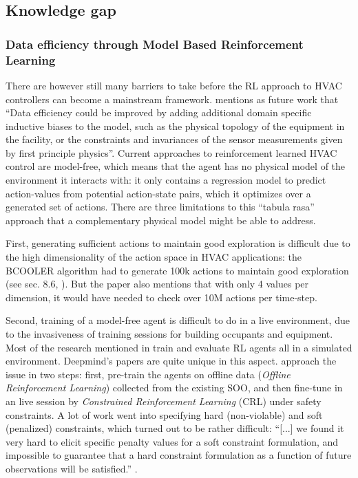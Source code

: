 \documentclass{article}
\theoremstyle{definition}
\theoremstyle{remark}
\begin{document}
\subsection{Knowledge gap}
\subsubsection{Data efficiency through Model Based Reinforcement Learning}
There are however still many barriers to take before the RL approach to HVAC controllers can become a mainstream framework. \cite{luo2022controlling} mentions as future work that ``Data efficiency could be improved by adding additional domain specific inductive biases to the model, such as the physical topology of the equipment in the facility, or the constraints and invariances of the sensor measurements given by first principle physics''. Current approaches to reinforcement learned HVAC control are model-free, which means that the agent has no physical model of the environment it interacts with: it only contains a regression model to predict action-values from potential action-state pairs, which it optimizes over a generated set of actions. There are three limitations to this ``tabula rasa'' approach that a complementary physical model might be able to address.

First, generating sufficient actions to maintain good exploration is difficult due to the high dimensionality of the action space in HVAC applications: the BCOOLER algorithm had to generate 100k actions to maintain good exploration (see sec. 8.6, \cite{luo2022controlling}). But the paper also mentions that with only 4 values per dimension, it would have needed to check over 10M actions per time-step.

Second, training of a model-free agent is difficult to do in a live environment, due to the invasiveness of training sessions for building occupants and equipment. Most of the research mentioned in \cite{Yuetal} train and evaluate RL agents all in a simulated environment. Deepmind's papers are quite unique in this aspect. \cite{evans_gao_2016, gamble_gao_2018, luo2022controlling} approach the issue in two steps: first, pre-train the agents on offline data (\textit{Offline Reinforcement Learning}) collected from the existing SOO, and then fine-tune in an live session by \textit{Constrained Reinforcement Learning} (CRL) under safety constraints. A lot of work went into specifying hard (non-violable) and soft (penalized) constraints, which turned out to be rather difficult: ``[...] we found it very hard to elicit specific penalty values for a soft constraint formulation, and impossible to guarantee that a hard constraint formulation as a function of future observations will be satisfied.'' \cite{luo2022controlling}.
\end{document}
